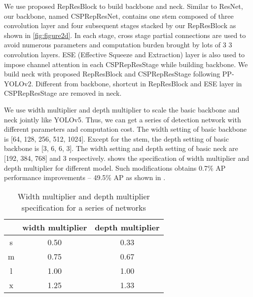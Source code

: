 \documentclass[final]{cvpr}
\begin{document}
We use proposed RepResBlock to build backbone and neck. Similar to ResNet, our backbone, named CSPRepResNet, contains one stem composed of three convolution layer and four subsequent stages stacked by our RepResBlock as shown in \cref{fig:figure2d}. In each stage, cross stage partial connections are used to avoid numerous parameters and computation burden brought by lots of 3  3 convolution layers. ESE (Effective Squeeze and Extraction) layer is also used to impose channel attention in each CSPRepResStage while building backbone. We build neck with proposed RepResBlock and CSPRepResStage following PP-YOLOv2\cite{huang2021pp-yolov2}. Different from backbone, shortcut in RepResBlock and ESE layer in CSPRepResStage are removed in neck.

We use width multiplier  and depth multiplier  to scale the basic backbone and neck jointly like YOLOv5\cite{glenn_jocher_2022_6222936}. Thus, we can get a series of detection network with different parameters and computation cost. The width setting of basic backbone is [64, 128, 256, 512, 1024]. Except for the stem, the depth setting of basic backbone is [3, 6, 6, 3]. The width setting and depth setting of basic neck are [192, 384, 768] and 3 respectively.  shows the specification of width multiplier  and depth multiplier  for different model. Such modifications obtains 0.7\% AP performance improvements -- 49.5\% AP as shown in . 
\begin{table}[!h]
	\centering
	\begin{center}
		\begin{tabular}{c|c|c}
			\hline
			    & width multiplier  & depth multiplier  \\
			\hline
			
			s   & 0.50 & 0.33   \\
			m   & 0.75 & 0.67   \\
			l   & 1.00 & 1.00   \\
			x   & 1.25 & 1.33   \\
			\hline
		\end{tabular}
	\end{center}
	\caption{Width multiplier  and depth multiplier  specification for a series of networks}
	\label{table1}
\end{table}





~\\
\end{document}
